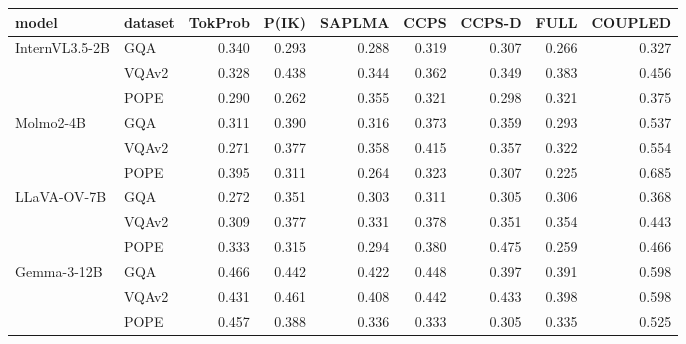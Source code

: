 \small
\setlength{\tabcolsep}{6pt}
\begin{tabular}{@{}llrrrrrrr@{}}
\toprule
model & dataset & TokProb & P(IK) & SAPLMA & CCPS & CCPS-D & FULL & COUPLED \\
\midrule
\multirow{3}{*}{InternVL3.5-2B} & GQA & 0.340 & 0.293 & 0.288 & 0.319 & 0.307 & 0.266 & 0.327 \\
 & VQAv2 & 0.328 & 0.438 & 0.344 & 0.362 & 0.349 & 0.383 & 0.456 \\
 & POPE & 0.290 & 0.262 & 0.355 & 0.321 & 0.298 & 0.321 & 0.375 \\
\midrule
\multirow{3}{*}{Molmo2-4B} & GQA & 0.311 & 0.390 & 0.316 & 0.373 & 0.359 & 0.293 & 0.537 \\
 & VQAv2 & 0.271 & 0.377 & 0.358 & 0.415 & 0.357 & 0.322 & 0.554 \\
 & POPE & 0.395 & 0.311 & 0.264 & 0.323 & 0.307 & 0.225 & 0.685 \\
\midrule
\multirow{3}{*}{LLaVA-OV-7B} & GQA & 0.272 & 0.351 & 0.303 & 0.311 & 0.305 & 0.306 & 0.368 \\
 & VQAv2 & 0.309 & 0.377 & 0.331 & 0.378 & 0.351 & 0.354 & 0.443 \\
 & POPE & 0.333 & 0.315 & 0.294 & 0.380 & 0.475 & 0.259 & 0.466 \\
\midrule
\multirow{3}{*}{Gemma-3-12B} & GQA & 0.466 & 0.442 & 0.422 & 0.448 & 0.397 & 0.391 & 0.598 \\
 & VQAv2 & 0.431 & 0.461 & 0.408 & 0.442 & 0.433 & 0.398 & 0.598 \\
 & POPE & 0.457 & 0.388 & 0.336 & 0.333 & 0.305 & 0.335 & 0.525 \\
\bottomrule
\end{tabular}

\vspace{3pt}
